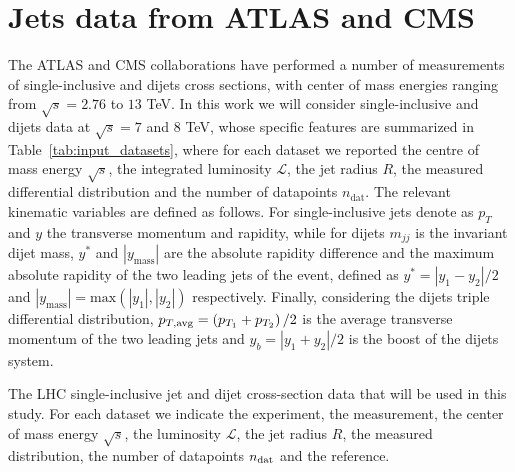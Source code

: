 \section{Jets data from ATLAS and CMS}
The ATLAS and CMS collaborations have performed a number of measurements of single-inclusive and 
dijets cross sections, with center of mass energies ranging from $\sqrt{s}=2.76$ to $13$ TeV.
In this work we will consider single-inclusive and dijets data at $\sqrt{s}=7$ and $8$ TeV,
whose specific features are summarized in Table~\ref{tab:input_datasets}, where for each dataset we reported
the centre of mass energy $\sqrt{s}$, the integrated luminosity $\mathcal{L}$, the jet radius $R$,
the measured differential distribution and the number of datapoints $n_{\text{dat}}$.
The relevant kinematic variables are defined as follows.
For single-inclusive jets denote as $p_T$ and $y$ the transverse momentum and rapidity,
while for dijets $m_{jj}$ is the invariant dijet mass, $y^*$ and $|y_{\text{mass}}|$ are the absolute rapidity difference
and the maximum absolute rapidity of the two leading jets of the event, defined as $y^*=|y_1-y_2|/2$
and $|y_{\text{mass}}|= \text{max}\left(|y_1|,|y_2|\right)$ respectively.
Finally, considering the dijets triple differential distribution,
$p_{T,\rm avg} = \left(p_{T_1}+p_{T_2}\right)/2$ is the average transverse momentum of the two leading jets and 
$y_b = |y_1+y_2|/2$ is the boost of the dijets system.


\begin{table}[!t]
    \centering
    \scriptsize
    \renewcommand{\arraystretch}{1.90}
    
    \vspace{0.3cm}
    \caption{\small The LHC single-inclusive jet and dijet cross-section data
       that will be used  in this study. For each dataset we indicate the experiment,
       the measurement, the center of mass energy $\sqrt{s}$, the luminosity 
       $\mathcal{L}$, the jet radius $R$, the measured distribution, the number of 
       datapoints $n_{\rm dat}$ and the reference.}
    \label{tab:input_datasets}
\end{table}
    